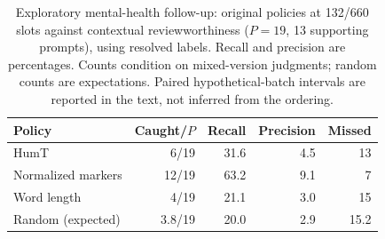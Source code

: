 \begin{table}[htbp]
\centering\small
\caption{Exploratory mental-health follow-up: original policies at 132/660 slots against contextual reviewworthiness ($P=19$, 13 supporting prompts), using resolved labels. Recall and precision are percentages. Counts condition on mixed-version judgments; random counts are expectations. Paired hypothetical-batch intervals are reported in the text, not inferred from the ordering.}
\label{tab:annotation_coverage}
\begin{tabular}{lrrrr}
\toprule
Policy & Caught/$P$ & Recall & Precision & Missed \\
\midrule
HumT & 6/19 & 31.6 & 4.5 & 13 \\
Normalized markers & 12/19 & 63.2 & 9.1 & 7 \\
Word length & 4/19 & 21.1 & 3.0 & 15 \\
Random (expected) & 3.8/19 & 20.0 & 2.9 & 15.2 \\
\bottomrule
\end{tabular}
\end{table}
